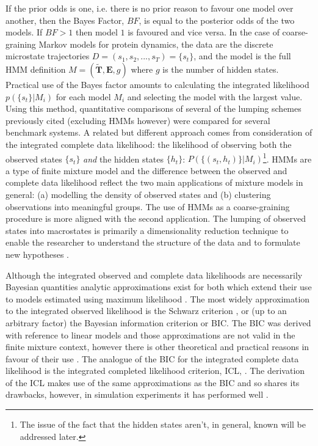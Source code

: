 If the prior odds is one, i.e. there is no prior reason to favour one model over another, then the Bayes Factor, $BF$, is equal to the posterior odds of the two models. If $BF > 1$ then model $1$ is favoured and vice versa. In the case of coarse-graining Markov models for protein dynamics, the data are the discrete microstate trajectories $D = (s_1, s_2, ..., s_T)= \{s_t\}$, and the model is the full HMM definition $M = (\tilde{\mathbf{T}}, \mathbf{E}, g)$ where $g$ is the number of hidden states. Practical use of the Bayes factor amounts to calculating the integrated likelihood $p(\{s_t\}|M_i)$ for each model $M_i$ and selecting the model with the largest value. Using this method, quantitative comparisons of several of the lumping schemes previously cited  (excluding HMMs however) were \cite{bowmanQuantitativeComparisonAlternative2013} compared for several benchmark systems.    
A related but different approach comes from consideration of the integrated complete data likelihood: the likelihood of observing both the observed states $\{s_t\}$ \emph{and} the hidden states $\{h_t\}$: $P(\{(s_t, h_t)\}|M_{i})$\footnote{The issue of the fact that the hidden states aren't, in general, known will be addressed later.}. HMMs are a type of finite mixture model\cite{mclachlanFiniteMixtureModels2000} and the difference between the observed and complete data likelihood reflect the two main applications of mixture models in general: (a) modelling the density of observed states  and (b) clustering observations into meaningful groups\cite{mclachlan1988mixture}. The use of HMMs as a coarse-graining procedure is more aligned with the second application. The lumping of observed states into macrostates is primarily a dimensionality reduction technique to enable the researcher to understand the structure of the data and to formulate new hypotheses \cite{bowmanQuantitativeComparisonAlternative2013}.

Although the integrated observed  and complete data likelihoods are necessarily Bayesian quantities  analytic approximations exist for both which extend their use to models estimated using maximum likelihood \cite{kassBayesFactors1995}\cite{mclachlanFiniteMixtureModels2000}. The most widely approximation to the integrated observed likelihood is the Schwarz criterion \cite{schwarzEstimatingDimensionModel1978a}, or (up to an arbitrary factor) the Bayesian information criterion or BIC. The BIC was derived with reference to linear models and those approximations are not valid in the finite mixture context, however there is other theoretical and practical reasons in favour of their use \cite{fraley1998many}. The analogue of the BIC for the integrated complete data likelihood is the integrated completed likelihood criterion, ICL, \cite{biernackiAssessingMixtureModel2000a}. The derivation of the ICL makes use of the same approximations as the BIC and so shares its drawbacks, however, in simulation experiments it has performed well \cite{mclachlanFiniteMixtureModels2000}. 

